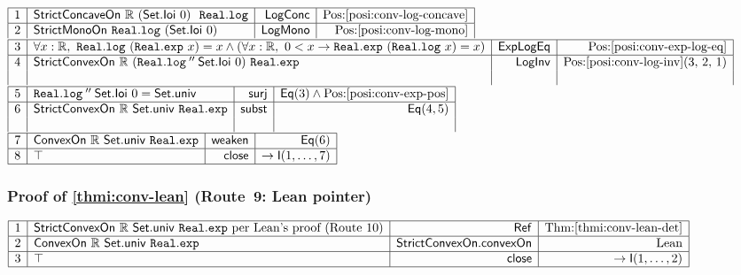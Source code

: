 \documentclass[11pt,reqno]{amsart}
\theoremstyle{redplain}
\numberwithin{equation}{section}
\begin{document}
\begin{center}
$%
\begin{array}{|c|l|r|r|}
\hline
1 & \mathsf{StrictConcaveOn}\ \mathbb{R}\ (\mathsf{Set.Ioi}\ 0)\ \mathtt{\
Real.log} & \mathsf{LogConc} & \mbox{Pos:\ref{posi:conv-log-concave}} \\ 
\hline
2 & \mathsf{StrictMonoOn}\ \mathtt{Real.log}\ (\mathsf{Set.Ioi}\ 0) & 
\mathsf{LogMono} & \mbox{Pos:\ref{posi:conv-log-mono}}%
\end{array}
$ \noindent $%
\begin{array}{|c|l|r|r|}
\hline
3 & \forall x:\mathbb{R},\ \mathtt{Real.log}\ (\mathtt{Real.exp}\ x)=x\wedge
(\forall x:\mathbb{R},\ 0<x\rightarrow \mathtt{Real.exp}\ (\mathtt{Real.log}
\ x)=x) & \mathsf{ExpLogEq} & \mbox{Pos:\ref{posi:conv-exp-log-eq}} \\ \hline
4 & \mathsf{StrictConvexOn}\ \mathbb{R}\ (\mathtt{Real.log}\mathbin{''}%
\mathsf{Set.Ioi}\ 0)\ \mathtt{Real.exp} & \mathsf{LogInv} & %
\mbox{Pos:\ref{posi:conv-log-inv}(3, 2, 1)} \\ 
&  &  & 
\end{array}
$ \noindent $%
\begin{array}{|c|l|r|r|}
\hline
5 & \mathtt{Real.log}\mathbin{''}\mathsf{Set.Ioi}\ 0 = \mathsf{Set.univ} & 
\mathsf{surj} & \mathsf{Eq}(3)\wedge \mbox{Pos:\ref{posi:conv-exp-pos}} \\ 
\hline
6 & \mathsf{StrictConvexOn}\ \mathbb{R}\ \mathsf{Set.univ}\ \mathtt{Real.exp}
& \mathsf{subst} & \mathsf{Eq}(4,5) \\ 
&  &  & 
\end{array}
$ \noindent $%
\begin{array}{|c|l|r|r|}
\hline
7 & \mathsf{ConvexOn}\ \mathbb{R}\ \mathsf{Set.univ}\ \mathtt{Real.exp} & 
\mathsf{weaken} & \mathsf{Eq}(6) \\ \hline
8 & \top & \mathsf{close} & \rightarrow \mathsf{I}(1,\dots ,7) \\ \hline
\end{array}
$
\end{center}

\subsubsection*{Proof of \autoref{thmi:conv-lean} (Route~9: Lean pointer)}

\begin{center}
$%
\begin{array}{|c|l|r|r|}
\hline
1 & \mathsf{StrictConvexOn}\ \mathbb{R}\ \mathsf{Set.univ}\ \mathtt{Real.exp}
\ \text{per Lean's proof (Route~10)} & \mathsf{Ref} & \mbox{Thm:%
\ref{thmi:conv-lean-det}} \\ \hline
2 & \mathsf{ConvexOn}\ \mathbb{R}\ \mathsf{Set.univ}\ \mathtt{Real.exp} & 
\mathsf{StrictConvexOn}.\allowbreak\mathsf{convexOn} & \text{Lean} \\ \hline
3 & \top & \mathsf{close} & \rightarrow \mathsf{I}(1,\dots ,2) \\ \hline
\end{array}
$
\end{center}
\end{document}
